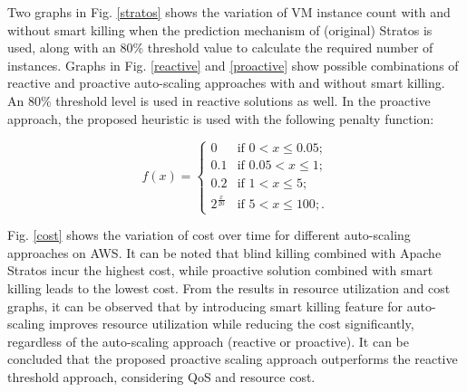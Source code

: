 Two graphs in Fig. \ref{stratos} shows the variation of VM instance count with and without smart killing when the prediction mechanism of (original) Stratos is used, along with an 80\% threshold value to calculate the required number of instances. Graphs in Fig. \ref{reactive} and \ref{proactive} show possible combinations of reactive and proactive auto-scaling approaches with and without smart killing. An 80\% threshold level is used in reactive solutions as well. In the proactive approach, the proposed heuristic is used with the following penalty function:

$$f(x) = \begin{cases} 
0 & \text{if $0 < x \le 0.05$}; \\
0.1 & \text{if $0.05 < x \le 1$}; \\
0.2 & \text{if $1 < x \le 5$};\\
2^{\frac{x}{20}} & \text{if $5 < x \le 100$};.\end{cases} $$

Fig. \ref{cost} shows the variation of cost over time for different auto-scaling approaches on AWS. It can be noted that blind killing combined with Apache Stratos incur the highest cost, while proactive solution combined with smart killing leads to the lowest cost. From the results in resource utilization and cost graphs, it can be observed that by introducing smart killing feature for auto-scaling improves resource utilization while reducing the cost significantly, regardless of the auto-scaling approach (reactive or proactive). It can be concluded that the proposed proactive scaling approach outperforms the reactive threshold approach, considering QoS and resource cost.